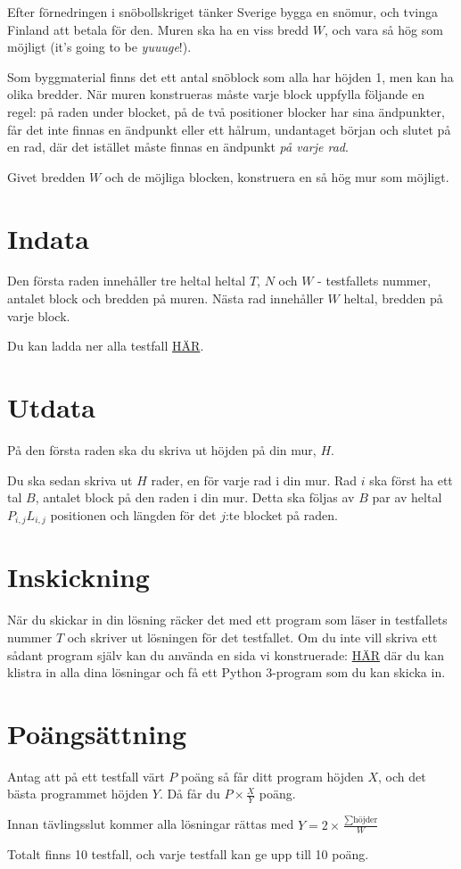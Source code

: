 Efter förnedringen i snöbollskriget tänker Sverige bygga en snömur, och tvinga Finland att betala för den.
Muren ska ha en viss bredd $W$, och vara så hög som möjligt (it's going to be \emph{yuuuge}!).

Som byggmaterial finns det ett antal snöblock som alla har höjden 1, men kan ha olika bredder.
När muren konstrueras måste varje block uppfylla följande en regel: på raden under blocket,
på de två positioner blocker har sina ändpunkter, får det inte finnas en ändpunkt eller ett hålrum,
undantaget början och slutet på en rad, där det istället måste finnas en ändpunkt \emph{på varje rad}.

Givet bredden $W$ och de möjliga blocken, konstruera en så hög mur som möjligt.

\section*{Indata}
Den första raden innehåller tre heltal heltal $T$, $N$ och $W$ - testfallets nummer, antalet block och bredden på muren.
Nästa rad innehåller $W$ heltal, bredden på varje block.

Du kan ladda ner alla testfall \url{HÄR}.

\section*{Utdata}
På den första raden ska du skriva ut höjden på din mur, $H$.

Du ska sedan skriva ut $H$ rader, en för varje rad i din mur.
Rad $i$ ska först ha ett tal $B$, antalet block på den raden i din mur.
Detta ska följas av $B$ par av heltal $P_{i,j} L_{i,j}$ positionen och längden för det $j$:te blocket på raden.

\section*{Inskickning}
När du skickar in din lösning räcker det med ett program som läser in testfallets nummer $T$ och skriver ut lösningen för det testfallet.
Om du inte vill skriva ett sådant program själv kan du använda en sida vi konstruerade: \url{HÄR} där du kan klistra in
alla dina lösningar och få ett Python 3-program som du kan skicka in.

\section*{Poängsättning}
Antag att på ett testfall värt $P$ poäng så får ditt program höjden $X$, och det bästa programmet höjden $Y$. Då får du $P \times \frac{X}{Y}$ poäng.

Innan tävlingsslut kommer alla lösningar rättas med $Y = 2 \times \frac{\sum{\text{höjder}}}{W}$

Totalt finns 10 testfall, och varje testfall kan ge upp till 10 poäng.
